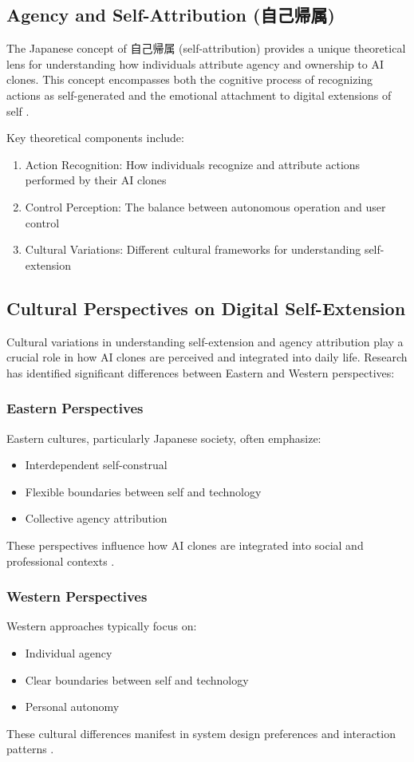 \subsection{Agency and Self-Attribution (自己帰属)}

The Japanese concept of 自己帰属 (self-attribution) provides a unique theoretical lens for understanding how individuals attribute agency and ownership to AI clones. This concept encompasses both the cognitive process of recognizing actions as self-generated and the emotional attachment to digital extensions of self \citep{maeda2023self}.

Key theoretical components include:
\begin{enumerate}
\item Action Recognition: How individuals recognize and attribute actions performed by their AI clones
\item Control Perception: The balance between autonomous operation and user control
\item Cultural Variations: Different cultural frameworks for understanding self-extension
\end{enumerate}

\subsection{Cultural Perspectives on Digital Self-Extension}

Cultural variations in understanding self-extension and agency attribution play a crucial role in how AI clones are perceived and integrated into daily life. Research has identified significant differences between Eastern and Western perspectives:

\subsubsection{Eastern Perspectives}
Eastern cultures, particularly Japanese society, often emphasize:
\begin{itemize}
\item Interdependent self-construal
\item Flexible boundaries between self and technology
\item Collective agency attribution
\end{itemize}
These perspectives influence how AI clones are integrated into social and professional contexts \citep{nakagawa2019cultural}.

\subsubsection{Western Perspectives}
Western approaches typically focus on:
\begin{itemize}
\item Individual agency
\item Clear boundaries between self and technology
\item Personal autonomy
\end{itemize}
These cultural differences manifest in system design preferences and interaction patterns \citep{dejuan2024western}.

